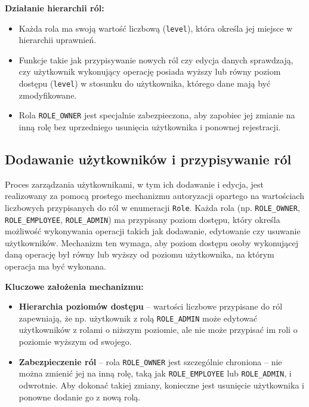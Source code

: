 \textbf{Działanie hierarchii ról:}
\begin{itemize}
    \item Każda rola ma swoją wartość liczbową (\texttt{level}), która określa jej miejsce w hierarchii uprawnień.
    \item Funkcje takie jak przypisywanie nowych ról czy edycja danych sprawdzają, czy użytkownik wykonujący operację posiada wyższy lub równy poziom dostępu (\texttt{level}) w stosunku do użytkownika, którego dane mają być zmodyfikowane.
    \item Rola \texttt{ROLE\_OWNER} jest specjalnie zabezpieczona, aby zapobiec jej zmianie na inną rolę bez uprzedniego usunięcia użytkownika i ponownej rejestracji.
\end{itemize}


\subsection{Dodawanie użytkowników i przypisywanie ról}

Proces zarządzania użytkownikami, w tym ich dodawanie i edycja, jest realizowany za pomocą prostego mechanizmu autoryzacji opartego na wartościach liczbowych przypisanych do ról w enumeracji \texttt{Role}. Każda rola (np. \texttt{ROLE\_OWNER}, \texttt{ROLE\_EMPLOYEE}, \texttt{ROLE\_ADMIN}) ma przypisany poziom dostępu, który określa możliwość wykonywania operacji takich jak dodawanie, edytowanie czy usuwanie użytkowników. Mechanizm ten wymaga, aby poziom dostępu osoby wykonującej daną operację był równy lub wyższy od poziomu użytkownika, na którym operacja ma być wykonana.

\textbf{Kluczowe założenia mechanizmu:}
\begin{itemize}
    \item \textbf{Hierarchia poziomów dostępu} -- wartości liczbowe przypisane do ról zapewniają, że np. użytkownik z rolą \texttt{ROLE\_ADMIN} może edytować użytkowników z rolami o niższym poziomie, ale nie może przypisać im roli o poziomie wyższym od swojego.
    \item \textbf{Zabezpieczenie ról} -- rola \texttt{ROLE\_OWNER} jest szczególnie chroniona – nie można zmienić jej na inną rolę, taką jak \texttt{ROLE\_EMPLOYEE} lub \texttt{ROLE\_ADMIN}, i odwrotnie. Aby dokonać takiej zmiany, konieczne jest usunięcie użytkownika i ponowne dodanie go z nową rolą.
\end{itemize}

